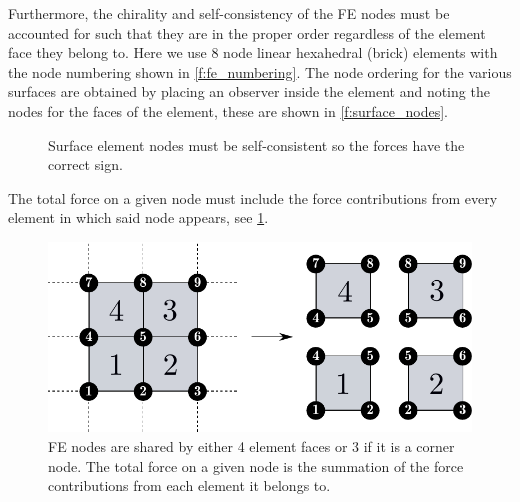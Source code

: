 \documentclass[11pt]{iopart}
\begin{document}
Furthermore, the chirality and self-consistency of the  FE nodes must be accounted for such that they are in the proper order regardless of the element face they belong to. Here we use 8  node linear hexahedral (brick) elements with the node numbering shown in \cref{f:fe_numbering}. The node ordering for the various surfaces are obtained by placing an observer inside the element and noting the nodes for the faces of the element, these are shown in \cref{f:surface_nodes}.
%
\begin{figure}
    \centering
    \hfill
    \caption{Surface element nodes must be self-consistent so the forces have the correct sign.}
\end{figure}
%
The total force on a given node must include the force contributions from every element in which said node appears, see \cref{f:shared_node}.
%
\begin{figure}[htb]
    \centering
    \includegraphics[width=\linewidth]{images/lrse_thread_map.pdf}
    \caption{FE nodes are shared by either 4 element faces or 3 if it is a corner node. The total force on a given node is the summation of the force contributions from each element it belongs to.}
    \label{f:shared_node}
\end{figure}
\end{document}
